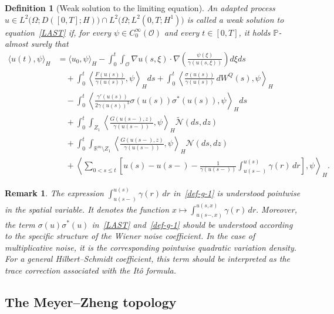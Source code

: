 \documentclass[11pt]{article}
\theoremstyle{plain}
\newtheorem{definition}[theorem]{Definition}
\newtheorem{remark}[theorem]{Remark}
\numberwithin{equation}{section}
\begin{document}
 

 
\begin{definition}[Weak solution to the limiting equation]\label{def:P3}
An adapted process \( u\in L^2\bigl(\Omega;D([0,T];H)\bigr) \cap L^2\bigl(\Omega;L^2(0,T;H^1)\bigr)\)
is called a weak solution to equation~\eqref{LAST} if, for every \(\psi\in C_0^\infty(\mathcal O)\) and every \(t\in[0,T]\), it holds
\(\mathbb P\)-almost surely that
\begin{align}\label{def-g-1}
\langle u(t),\psi\rangle_H &=\langle u_0,\psi\rangle_H-\int_0^t\int_{\mathcal O}\nabla u(s,\xi)\cdot\nabla\left(\frac{\psi(\xi)}{\gamma(u(s,\xi))}\right)d\xi ds\nonumber\\
&\quad+\int_0^t\left\langle\frac{F(u(s))}{\gamma(u(s))},\psi\right\rangle_Hds+\int_0^t\left\langle\frac{\sigma(u(s))}{\gamma(u(s))}\,dW^Q(s),\psi\right\rangle_H\nonumber\\
&\quad-\int_0^t\left\langle\frac{\gamma'(u(s))}{2\gamma(u(s))^3}\sigma(u(s))\sigma^*(u(s)),\psi\right\rangle_Hds\nonumber\\
&\quad+\int_0^t\int_{Z_1}\left\langle\frac{G(u(s-),z)}{\gamma(u(s-))},\psi\right\rangle_H\tilde{\mathcal N}(ds,dz)\nonumber\\
&\quad+\int_0^t\int_{\mathbb R^m\setminus Z_1}\left\langle\frac{G(u(s-),z)}{\gamma(u(s-))},\psi\right\rangle_H\mathcal N(ds,dz)\nonumber\\
&\quad+\left\langle\sum_{0<s\le t}\left[u(s)-u(s-)-\frac1{\gamma(u(s-))}\int_{u(s-)}^{u(s)}\gamma(r)\,dr\right],\psi \right\rangle_H .
\end{align}
\end{definition}

 
 

\begin{remark}
The expression \(\int_{u(s-)}^{u(s)}\gamma(r)\,dr\) in~\eqref{def-g-1} is understood pointwise in the spatial variable.  
It denotes the function \(x\mapsto \int_{u(s-,x)}^{u(s,x)}\gamma(r)\,dr .\) Moreover, the term \(\sigma(u)\sigma^*(u)\)
in~\eqref{LAST} and~\eqref{def-g-1} should be understood according to the
specific structure of the Wiener noise coefficient. In the case of multiplicative noise, it is the corresponding pointwise quadratic variation
density. For a general Hilbert--Schmidt coefficient, this term should be interpreted as the trace correction associated with the It\^o formula.
\end{remark}






\subsection{The Meyer--Zheng topology}
\end{document}
